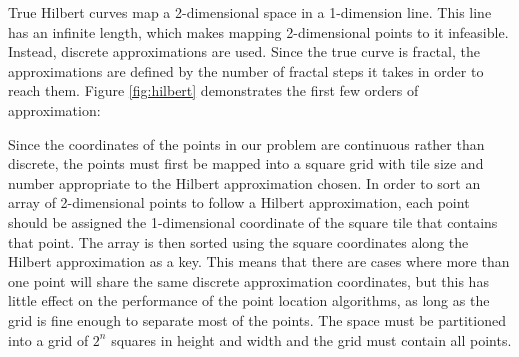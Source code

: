 True Hilbert curves map a 2-dimensional space in a 1-dimension line. This line has an infinite length, which makes mapping 2-dimensional points to it infeasible. Instead, discrete approximations are used. Since the true curve is fractal, the approximations are defined by the number of fractal steps it takes in order to reach them. Figure \ref*{fig:hilbert} demonstrates the first few orders of approximation:

\noindent
Since the coordinates of the points in our problem are continuous rather than discrete, the points must first be mapped into a square grid with tile size and number appropriate to the Hilbert approximation chosen.
In order to sort an array of 2-dimensional points to follow a Hilbert approximation, each point should be assigned the 1-dimensional coordinate of the square tile that contains that point. The array is then sorted using the square coordinates along the Hilbert approximation as a key.
This means that there are cases where more than one point will share the same discrete approximation coordinates, but this has little effect on the performance of the point location algorithms, as long as the grid is fine enough to separate most of the points. The space must be partitioned into a grid of $2^n$ squares in height and width and the grid must contain all points.

\









